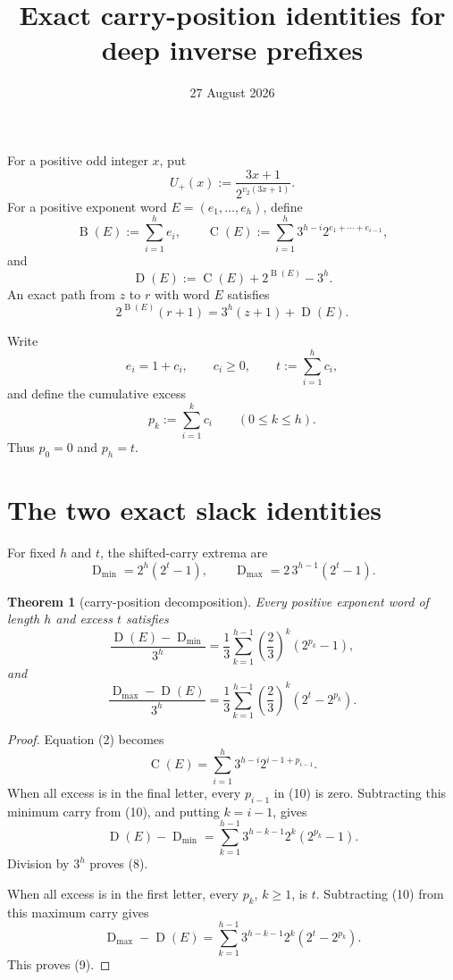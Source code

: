 \documentclass[11pt]{article}
\title{Exact carry-position identities for deep inverse prefixes}
\author{}
\date{27 August 2026}
\newtheorem{theorem}{Theorem}
\newcommand{\Up}{U_+}
\newcommand{\mass}{\operatorname{B}}
\newcommand{\car}{\operatorname{C}}
\newcommand{\sh}{\operatorname{D}}
\begin{document}
\raggedbottom
\maketitle

For a positive odd integer \(x\), put
\[
 \Up(x):=\frac{3x+1}{2^{v_2(3x+1)}}.
 \tag{1}
\]
For a positive exponent word \(E=(e_1,\ldots,e_h)\), define
\[
 \mass(E):=\sum_{i=1}^h e_i,
 \qquad
 \car(E):=\sum_{i=1}^h
 3^{h-i}2^{e_1+\cdots+e_{i-1}},
 \tag{2}
\]
and
\[
 \sh(E):=\car(E)+2^{\mass(E)}-3^h.
 \tag{3}
\]
An exact path from \(z\) to \(r\) with word \(E\) satisfies
\[
 2^{\mass(E)}(r+1)=3^h(z+1)+\sh(E).
 \tag{4}
\]

Write
\[
 e_i=1+c_i,
 \qquad
 c_i\geq0,
 \qquad
 t:=\sum_{i=1}^h c_i,
 \tag{5}
\]
and define the cumulative excess
\[
 p_k:=\sum_{i=1}^k c_i
 \qquad(0\leq k\leq h).
 \tag{6}
\]
Thus \(p_0=0\) and \(p_h=t\).

\section{The two exact slack identities}

For fixed \(h\) and \(t\), the shifted-carry extrema are
\[
 \sh_{\min}=2^h(2^t-1),
 \qquad
 \sh_{\max}=2\,3^{h-1}(2^t-1).
 \tag{7}
\]

\begin{theorem}[carry-position decomposition]
Every positive exponent word of length \(h\) and excess \(t\) satisfies
\[
 \boxed{
 \frac{\sh(E)-\sh_{\min}}{3^h}
 =
 \frac13\sum_{k=1}^{h-1}
 \left(\frac23\right)^k(2^{p_k}-1),}
 \tag{8}
\]
and
\[
 \boxed{
 \frac{\sh_{\max}-\sh(E)}{3^h}
 =
 \frac13\sum_{k=1}^{h-1}
 \left(\frac23\right)^k(2^t-2^{p_k}).}
 \tag{9}
\]
\end{theorem}

\begin{proof}
Equation (2) becomes
\[
 \car(E)=
 \sum_{i=1}^h3^{h-i}2^{i-1+p_{i-1}}.
 \tag{10}
\]
When all excess is in the final letter, every \(p_{i-1}\) in (10)
is zero.  Subtracting this minimum carry from (10), and putting
\(k=i-1\), gives
\[
 \sh(E)-\sh_{\min}
 =
 \sum_{k=1}^{h-1}
 3^{h-k-1}2^k(2^{p_k}-1).
 \tag{11}
\]
Division by \(3^h\) proves (8).

When all excess is in the first letter, every \(p_k\), \(k\geq1\), is
\(t\).  Subtracting (10) from this maximum carry gives
\[
 \sh_{\max}-\sh(E)
 =
 \sum_{k=1}^{h-1}
 3^{h-k-1}2^k(2^t-2^{p_k}).
 \tag{12}
\]
This proves (9).
\end{proof}
\end{document}
